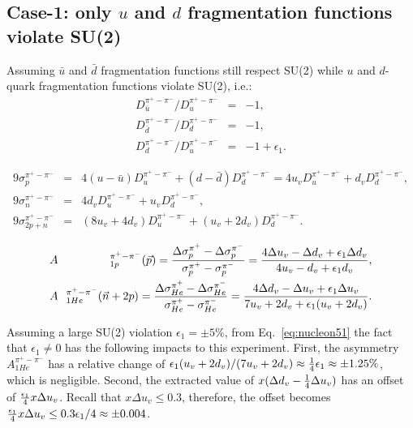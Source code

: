 \subsection{Case-1: only $u$ and $d$  fragmentation  functions violate SU(2)}
Assuming $\bar{u}$ and $\bar{d}$ fragmentation functions 
still respect SU(2) while $u$ and $d$-quark fragmentation functions violate 
SU(2), i.e.:
\begin{eqnarray}  
 D_{\bar u}^{\pi^+ -\pi^-}/D_u^{\pi^+ -\pi^-} & = & -1, \nonumber \\ 
 D_{\bar d}^{\pi^+ -\pi^-}/D_d^{\pi^+ -\pi^-} & = & -1, \nonumber \\ 
 D_{d}^{\pi^+ -\pi^-}/D_u^{\pi^+ -\pi^-} & = & -1+\epsilon_1.
\label{eq:nucleon4}  
\end{eqnarray}  

\begin{eqnarray}  
 9 \sigma_p^{\pi^+ -\pi^-} & = & 4 (u-\bar{u}) D_u^{\pi^+ -\pi^-}
   + (d-\bar{d}) D_d^{\pi^+ -\pi^-} = 4 u_v D_u^{\pi^+ -\pi^-} + d_v D_d^{\pi^+ -\pi^-} , \nonumber \\ 
 9 \sigma_n^{\pi^+ -\pi^-} & = & 4 d_v D_u^{\pi^+ -\pi^-} + u_v D_d^{\pi^+ -\pi^-}, \nonumber \\ 
 9 \sigma_{2p+n}^{\pi^+ -\pi^-} & = & (8u_v + 4 d_v) D_u^{\pi^+ -\pi^-} + (u_v+2d_v) D_d^{\pi^+ -\pi^-}.
\label{eq:nucleon5}  
\end{eqnarray}  

\begin{eqnarray}
\label{eq:cllo}
&A&\hspace{-0.1cm}_{1p}^{\pi^+ - \pi^-}({\vec p})  =  { \Delta \sigma_p^{\pi^+}-\Delta \sigma_p^{\pi^-} \over
\sigma_p^{\pi^+} - \sigma_p^{\pi^-} }=
{  4\Delta u_v - \Delta d_v + \epsilon_1 \Delta d_v
\over 4u_v - d_v + \epsilon_1 d_v}, \\
&A&\hspace{-0.1cm}_{1He}^{\pi^+ - \pi^-} ({\vec n}+2p) =  { \Delta \sigma_{He}^{\pi^+}-\Delta \sigma_{He}^{\pi^-} \over
\sigma_{He}^{\pi^+}- \sigma_{He}^{\pi^-} }=
{ 4\Delta d_v - \Delta u_v + \epsilon_1 \Delta u_v
\over 7 u_v + 2 d_v + \epsilon_1 (u_v + 2 d_v)}. 
\label{eq:nucleon51}  
\end{eqnarray}

 Assuming a large SU(2) violation  $\epsilon_1= \pm 5 \%$, from Eq.~\ref{eq:nucleon51} the fact that $\epsilon_1 \ne 0$ 
has the following impacts to this experiment. First, the asymmetry $A_{1He}^{\pi^+ - \pi^-}$ has a relative change
of $\epsilon_1 (u_v + 2 d_v)/(7 u_v + 2 d_v) \approx {1 \over 4} \epsilon_1 \approx \pm 1.25 \%$, which is negligible. Second, 
the extracted value of $x(\Delta d_v -{1 \over 4} \Delta u_v)$ has an offset of ${\epsilon_1 \over 4}  x \Delta u_v$. Recall that
$ x \Delta u_v \le 0.3$, therefore, the offset becomes ${\epsilon_1 \over 4}  x \Delta u_v \le 0.3 \epsilon_1 /4 \approx  \pm 0.004 $.

